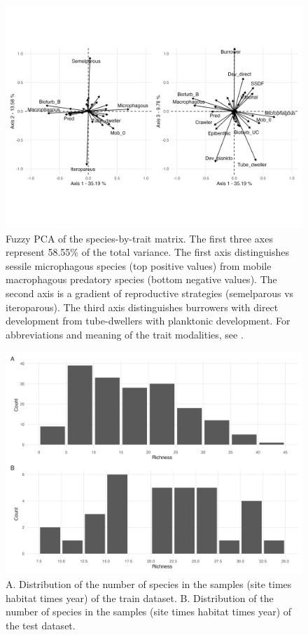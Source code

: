 \begin{figure}
\hypertarget{fig:chapt1supp2}{%
\centering
\includegraphics{03-Chapitre1/figures/supplementary/fig_supp2.png}
\caption{Fuzzy PCA of the species-by-trait matrix. The first three axes
represent 58.55\% of the total variance. The first axis distinguishes
sessile microphagous species (top positive values) from mobile
macrophagous predatory species (bottom negative values). The second axis
is a gradient of reproductive strategies (semelparous vs iteroparous).
The third axis distinguishes burrowers with direct development from
tube-dwellers with planktonic development. For abbreviations and meaning
of the trait modalities, see
\textcite{Boye_2019a}.}\label{fig:chapt1supp2}
}
\end{figure}

\begin{figure}
\hypertarget{fig:chapt1supp3}{%
\centering
\includegraphics{03-Chapitre1/figures/supplementary/fig_supp3.png}
\caption{A. Distribution of the number of species in the samples (site
times habitat times year) of the train dataset. B. Distribution of the
number of species in the samples (site times habitat times year) of the
test dataset.}\label{fig:chapt1supp3}
}
\end{figure}

